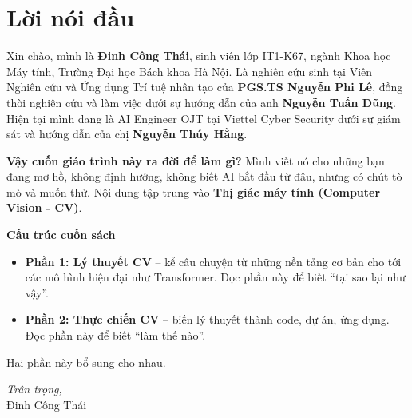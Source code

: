 \chapter*{Lời nói đầu}

\noindent
Xin chào, mình là \textbf{Đinh Công Thái}, sinh viên lớp IT1-K67, ngành Khoa học Máy tính, Trường Đại học Bách khoa Hà Nội. Là nghiên cứu sinh tại Viên Nghiên cứu và Ứng dụng Trí tuệ nhân tạo của \textbf{PGS.TS Nguyễn Phi Lê}, đồng thời nghiên cứu và làm việc dưới sự hướng dẫn của anh \textbf{Nguyễn Tuấn Dũng}. Hiện tại mình đang là AI Engineer OJT tại Viettel Cyber Security dưới sự giám sát và hướng dẫn của chị \textbf{Nguyễn Thúy Hằng}.

\vspace{1em}
\noindent
\textbf{Vậy cuốn giáo trình này ra đời để làm gì?}  
Mình viết nó cho những bạn đang mơ hồ, không định hướng, không biết AI bắt đầu từ đâu, nhưng có chút tò mò và muốn thử. Nội dung tập trung vào \textbf{Thị giác máy tính (Computer Vision - CV)}.  

\vspace{1em}
\noindent
\textbf{Cấu trúc cuốn sách}  

\begin{itemize}[leftmargin=*]
	\item \textbf{Phần 1: Lý thuyết CV} – kể câu chuyện từ những nền tảng cơ bản cho tới các mô hình hiện đại như Transformer. Đọc phần này để biết “tại sao lại như vậy”.  
	\item \textbf{Phần 2: Thực chiến CV} – biến lý thuyết thành code, dự án, ứng dụng. Đọc phần này để biết “làm thế nào”.  
\end{itemize}

Hai phần này bổ sung cho nhau.

\begin{flushright}
	\textit{Trân trọng,} \\[0.5em]
	Đinh Công Thái
\end{flushright}
